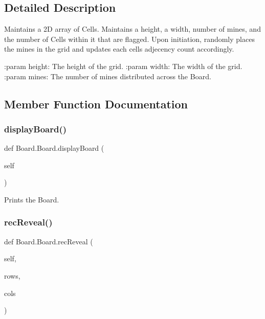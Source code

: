 \subsection{Detailed Description}
\begin{DoxyVerb}Maintains a 2D array of Cells. Maintains a height, a width, number of mines,
and the number of Cells within it that are flagged. Upon initiation,
randomly places the mines in the grid and updates each cells adjecency count
accordingly.

:param height: The height of the grid.
:param width: The width of the grid.
:param mines: The number of mines distributed across the Board.
\end{DoxyVerb}
 

\subsection{Member Function Documentation}
\mbox{\label{class_board_1_1_board_af52ea18259bf8d2a122de08fcb0ea308}} 
\subsubsection{\texorpdfstring{display\+Board()}{displayBoard()}}
{\footnotesize\ttfamily def Board.\+Board.\+display\+Board (\begin{DoxyParamCaption}\item[{}]{self }\end{DoxyParamCaption})}

\begin{DoxyVerb}Prints the Board.
\end{DoxyVerb}
 \mbox{\label{class_board_1_1_board_a4a027666af1fa52582af6543985a73c6}} 
\subsubsection{\texorpdfstring{rec\+Reveal()}{recReveal()}}
{\footnotesize\ttfamily def Board.\+Board.\+rec\+Reveal (\begin{DoxyParamCaption}\item[{}]{self,  }\item[{}]{rows,  }\item[{}]{cols }\end{DoxyParamCaption})}

